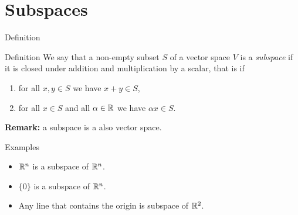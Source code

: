 \documentclass{beamer}
\begin{document}
\section{Subspaces}

\begin{frame}[t]{Definition}
	\begin{block}{Definition}
		We say that a non-empty subset $S$ of a vector space $V$ is a \emph{subspace} if it is closed under addition and multiplication by a scalar, that is if
		\begin{enumerate}
			\item for all $x,y \in S$ we have $x + y \in S$,
			\item for all $x \in S$ and all $\alpha \in \mathbb{R}$ we have $\alpha x \in S$.
		\end{enumerate}
	\end{block}
	\vspace{4cm}
	\textbf{Remark:} a subspace is a also vector space.
\end{frame}

\begin{frame}[t]{Examples}
	\begin{itemize}
		\item $\mathbb{R}^n$ is a subspace of $\mathbb{R}^n$.
			\vspace{1.2cm}
		\item $\{ 0 \}$ is a subspace of $\mathbb{R}^n$.
			\vspace{1.2cm}
		\item Any line that contains the origin is subspace of $\mathbb{R}^2$.
	\end{itemize}

\end{frame}


\end{document}
